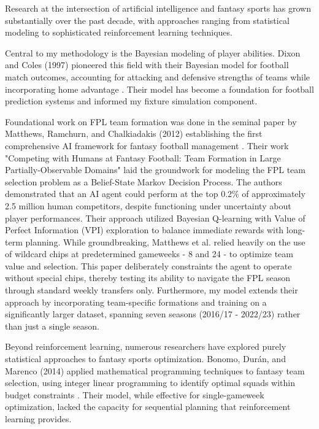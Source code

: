 Research at the intersection of artificial intelligence and fantasy sports has grown substantially over the past decade, with approaches ranging from statistical modeling to sophisticated reinforcement learning techniques.

Central to my methodology is the Bayesian modeling of player abilities. Dixon and Coles (1997) pioneered this field with their Bayesian model for football match outcomes, accounting for attacking and defensive strengths of teams while incorporating home advantage \cite{dixon1997}. Their model has become a foundation for football prediction systems and informed my fixture simulation component.

Foundational work on FPL team formation was done in the seminal paper by Matthews, Ramchurn, and Chalkiadakis (2012) establishing the first comprehensive AI framework for fantasy football management \cite{matthews2012}. Their work "Competing with Humans at Fantasy Football: Team Formation in Large Partially-Observable Domains" laid the groundwork for modeling the FPL team selection problem as a Belief-State Markov Decision Process. The authors demonstrated that an AI agent could perform at the top 0.2\% of approximately 2.5 million human competitors, despite functioning under uncertainty about player performances. Their approach utilized Bayesian Q-learning with Value of Perfect Information (VPI) exploration to balance immediate rewards with long-term planning. While groundbreaking, Matthews et al. relied heavily on the use of wildcard chips at predetermined gameweeks - 8 and 24 - to optimize team value and selection. This paper deliberately constraints the agent to operate without special chips, thereby testing its ability to navigate the FPL season through standard weekly transfers only. Furthermore, my model extends their approach by incorporating team-specific formations and training on a significantly larger dataset, spanning seven seasons (2016/17 - 2022/23) rather than just a single season.

Beyond reinforcement learning, numerous researchers have explored purely statistical approaches to fantasy sports optimization. Bonomo, Durán, and Marenco (2014) applied mathematical programming techniques to fantasy team selection, using integer linear programming to identify optimal squads within budget constraints \cite{bonomo2014}. Their model, while effective for single-gameweek optimization, lacked the capacity for sequential planning that reinforcement learning provides.